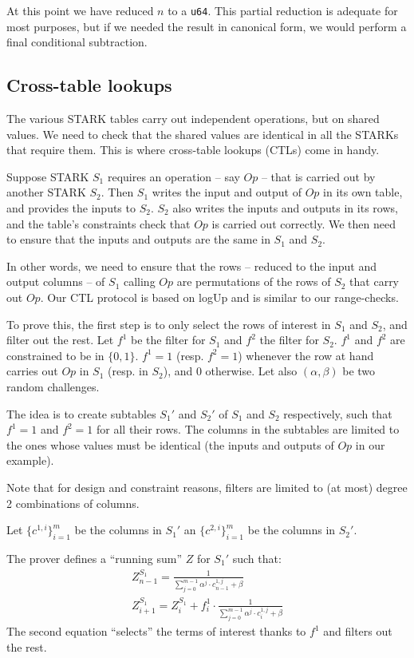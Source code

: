 At this point we have reduced $n$ to a \texttt{u64}. This partial reduction is adequate for most purposes, but if we needed the result in canonical form, we would perform a final conditional subtraction.

\subsection{Cross-table lookups}
\label{ctl}
The various STARK tables carry out independent operations, but on shared values. We need to check that the shared values are identical in all the STARKs that require them. This is where cross-table lookups (CTLs) come in handy. 

Suppose STARK $S_1$ requires an operation -- say $Op$ -- that is carried out by another STARK $S_2$. Then $S_1$ writes the input and output of $Op$ in its own table, and provides the inputs to $S_2$. $S_2$ also writes the inputs and outputs in its rows, and the table's constraints check that $Op$ is carried out correctly. We then need to ensure that the inputs and outputs are the same in $S_1$ and $S_2$.

In other words, we need to ensure that the rows -- reduced to the input and output columns -- of $S_1$ calling $Op$ are permutations of the rows of $S_2$ that carry out $Op$. Our CTL protocol is based on logUp and is similar to our range-checks.

To prove this, the first step is to only select the rows of interest in $S_1$ and $S_2$, and filter out the rest. Let $f^1$ be the filter for $S_1$ and $f^2$ the filter for $S_2$. $f^1$ and $f^2$ are constrained to be in $\{0, 1\}$. $f^1 = 1$ (resp. $f^2 = 1$) whenever the row at hand carries out $Op$ in $S_1$ (resp. in $S_2$), and 0 otherwise. Let also $(\alpha, \beta)$ be two random challenges.

The idea is to create subtables $S_1'$ and $S_2'$ of $S_1$ and $S_2$ respectively, such that $f^1 = 1$ and $f^2 = 1$ for all their rows. The columns in the subtables are limited to the ones whose values must be identical (the inputs and outputs of $Op$ in our example).

Note that for design and constraint reasons, filters are limited to (at most) degree 2 combinations of columns.

Let $\{c^{1, i}\}_{i=1}^m$ be the columns in $S_1'$ an $\{c^{2,i}\}_{i=1}^m$ be the columns in $S_2'$.

The prover defines a ``running sum'' $Z$ for $S_1'$ such that:
\begin{gather*}
  Z^{S_1}_{n-1} = \frac{1}{\sum_{j=0}^{m-1} \alpha^j \cdot c^{1, j}_{n-1} + \beta} \\
  Z^{S_1}_{i+1} = Z^{S_1}_i + f^1_i \cdot \frac{1}{\sum_{j=0}^{m-1} \alpha^j \cdot c^{1, j}_i + \beta}
\end{gather*}
The second equation ``selects'' the terms of interest thanks to $f^1$ and filters out the rest.

